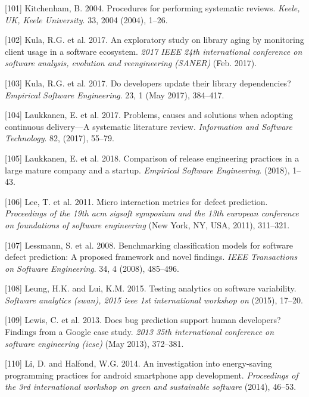 \documentclass[]{book}
\begin{document}
\hypertarget{ref-kitchenham2004procedures}{}
{[}101{]} Kitchenham, B. 2004. Procedures for performing systematic
reviews. \emph{Keele, UK, Keele University}. 33, 2004 (2004), 1--26.

\hypertarget{ref-Kula2017-2}{}
{[}102{]} Kula, R.G. et al. 2017. An exploratory study on library aging
by monitoring client usage in a software ecosystem. \emph{2017 IEEE 24th
international conference on software analysis, evolution and
reengineering (SANER)} (Feb. 2017).

\hypertarget{ref-Kula2017}{}
{[}103{]} Kula, R.G. et al. 2017. Do developers update their library
dependencies? \emph{Empirical Software Engineering}. 23, 1 (May 2017),
384--417.

\hypertarget{ref-laukkanen2017a}{}
{[}104{]} Laukkanen, E. et al. 2017. Problems, causes and solutions when
adopting continuous delivery---A systematic literature review.
\emph{Information and Software Technology}. 82, (2017), 55--79.

\hypertarget{ref-laukkanen2018a}{}
{[}105{]} Laukkanen, E. et al. 2018. Comparison of release engineering
practices in a large mature company and a startup. \emph{Empirical
Software Engineering}. (2018), 1--43.

\hypertarget{ref-Lee2011}{}
{[}106{]} Lee, T. et al. 2011. Micro interaction metrics for defect
prediction. \emph{Proceedings of the 19th acm sigsoft symposium and the
13th european conference on foundations of software engineering} (New
York, NY, USA, 2011), 311--321.

\hypertarget{ref-Lessman2008}{}
{[}107{]} Lessmann, S. et al. 2008. Benchmarking classification models
for software defect prediction: A proposed framework and novel findings.
\emph{IEEE Transactions on Software Engineering}. 34, 4 (2008),
485--496.

\hypertarget{ref-leung2015testing}{}
{[}108{]} Leung, H.K. and Lui, K.M. 2015. Testing analytics on software
variability. \emph{Software analytics (swan), 2015 ieee 1st
international workshop on} (2015), 17--20.

\hypertarget{ref-Lewis2013}{}
{[}109{]} Lewis, C. et al. 2013. Does bug prediction support human
developers? Findings from a Google case study. \emph{2013 35th
international conference on software engineering (icse)} (May 2013),
372--381.

\hypertarget{ref-LH2014}{}
{[}110{]} Li, D. and Halfond, W.G. 2014. An investigation into
energy-saving programming practices for android smartphone app
development. \emph{Proceedings of the 3rd international workshop on
green and sustainable software} (2014), 46--53.
\end{document}
